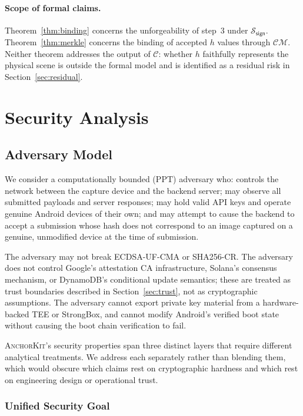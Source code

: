 \documentclass[11pt,a4paper]{article}
\newcommand{\ppt}{\mathrm{PPT}}
\newcommand{\calC}{\mathcal{C}}
\newcommand{\calCM}{\mathcal{CM}}
\newcommand{\Ssign}{\mathcal{S}_{\mathsf{sign}}}
\newcommand{\AK}{\textsc{AnchorKit}\xspace}
\begin{document}
\paragraph{Scope of formal claims.} Theorem~\ref{thm:binding} concerns the
unforgeability of step~3 under $\Ssign$.  Theorem~\ref{thm:merkle} concerns the
binding of accepted $h$ values through $\calCM$.  Neither theorem addresses the
output of $\calC$: whether $h$ faithfully represents the physical scene is
outside the formal model and is identified as a residual risk in
Section~\ref{sec:residual}.

\section{Security Analysis}
\label{sec:security}

\subsection{Adversary Model}
\label{sec:adversary}

We consider a computationally bounded ($\ppt$) adversary who: controls the
network between the capture device and the backend server; may observe all
submitted payloads and server responses; may hold valid API keys and operate
genuine Android devices of their own; and may attempt to cause the backend to
accept a submission whose hash does not correspond to an image captured on a
genuine, unmodified device at the time of submission.

The adversary may not break ECDSA-UF-CMA or SHA256-CR\@.  The adversary does
not control Google's attestation CA infrastructure, Solana's consensus
mechanism, or DynamoDB's conditional update semantics; these are treated as
trust boundaries described in Section~\ref{sec:trust}, not as cryptographic
assumptions.  The adversary cannot export private key material from a
hardware-backed TEE or StrongBox, and cannot modify Android's verified boot
state without causing the boot chain verification to fail.

\AK's security properties span three distinct layers that require different
analytical treatments.  We address each separately rather than blending them,
which would obscure which claims rest on cryptographic hardness and which rest
on engineering design or operational trust.

\subsubsection{Unified Security Goal}
\label{sec:secgoal}
\end{document}
